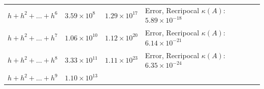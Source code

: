 \documentclass[
]{article}
\begin{document}
\begin{longtable}[]{@{}llll@{}}
\begin{minipage}[t]{0.17\columnwidth}
\(h+h^{2}+\dots+h^{6}\)\strut
\end{minipage} & \begin{minipage}[t]{0.16\columnwidth}\raggedright
\(3.59 \times 10^{8}\)\strut
\end{minipage} & \begin{minipage}[t]{0.16\columnwidth}\raggedright
\(1.29 \times 10^{17}\)\strut
\end{minipage} & \begin{minipage}[t]{0.40\columnwidth}\raggedright
Error, Recripocal \(\kappa(A)\): \(5.89 \times 10^{-18}\)\strut
\end{minipage}\tabularnewline
\begin{minipage}[t]{0.17\columnwidth}\raggedright
\(h+h^{2}+\dots+h^{7}\)\strut
\end{minipage} & \begin{minipage}[t]{0.16\columnwidth}\raggedright
\(1.06 \times 10^{10}\)\strut
\end{minipage} & \begin{minipage}[t]{0.16\columnwidth}\raggedright
\(1.12 \times 10^{20}\)\strut
\end{minipage} & \begin{minipage}[t]{0.40\columnwidth}\raggedright
Error, Recripocal \(\kappa(A)\): \(6.14 \times 10^{-21}\)\strut
\end{minipage}\tabularnewline
\begin{minipage}[t]{0.17\columnwidth}\raggedright
\(h+h^{2}+\dots+h^{8}\)\strut
\end{minipage} & \begin{minipage}[t]{0.16\columnwidth}\raggedright
\(3.33 \times 10^{11}\)\strut
\end{minipage} & \begin{minipage}[t]{0.16\columnwidth}\raggedright
\(1.11 \times 10^{23}\)\strut
\end{minipage} & \begin{minipage}[t]{0.40\columnwidth}\raggedright
Error, Recripocal \(\kappa(A)\): \(6.35 \times 10^{-24}\)\strut
\end{minipage}\tabularnewline
\begin{minipage}[t]{0.17\columnwidth}\raggedright
\(h+h^{2}+\dots+h^{9}\)\strut
\end{minipage} & \begin{minipage}[t]{0.16\columnwidth}\raggedright
\(1.10 \times 10^{13}\)\strut
\end{minipage} & \begin{minipage}[t]{0.16\columnwidth}\raggedright

\end{minipage}
\end{longtable}
\end{document}
